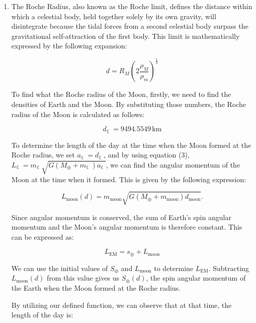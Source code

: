 \documentclass[12pt, letterpaper] {article}
\begin{document}
\begin{enumerate}
    \clearpage

    \item The Roche Radius, also known as the Roche limit, defines the distance within which a celestial body, held together solely by its own gravity, will disintegrate because the tidal forces from a second celestial body surpass the gravitational self-attraction of the first body. This limit is mathematically expressed by the following expansion:
    
    \begin{equation}
        {\displaystyle d=R_{M}\left(2{\frac {\rho _{M}}{\rho _{m}}}\right)^{\frac {1}{3}}}
    \end{equation}
  
    To find what the Roche radius of the Moon, firstly, we need to find the densities of Earth and the Moon. By substituting those numbers, the Roche radius of the Moon is calculated as follows:
    
    \begin{equation}
        d_{\leftmoon} = 9494.5549\, \text{km}
    \end{equation}
    
    To determine the length of the day at the time when the Moon formed at the Roche radius, we set $a_{\leftmoon} = d_{\leftmoon}$, and by using equation (3), $L_{\leftmoon} = m_{\leftmoon}\sqrt{G(M_{\oplus}+m_{\leftmoon})a_{\leftmoon}}$, we can find the angular momentum of the Moon at the time when it formed. This is given by the following expression:

    \begin{equation}
        L_{\text{moon}}(d) = m_{\text{moon}}\sqrt{G(M_{\oplus}+m_{\text{moon}})d_{\text{moon}}}.
    \end{equation}

    Since angular momentum is conserved, the sum of Earth's spin angular momentum and the Moon's angular momentum is therefore constant. This can be expressed as:
    
    \begin{equation}
        L_{\text{EM}} = s_{\oplus} + L_{\text{moon}}
    \end{equation}

    We can use the initial values of $S_{\oplus}$ and $L_{\text{moon}}$ to determine $L_{\text{EM}}$. Subtracting $L_{\text{moon}}(d)$ from this value gives us $S_{\oplus}(d)$, the spin angular momentum of the Earth when the Moon formed at the Roche radius.

    By utilizing our defined function, we can observe that at that time, the length of the day is:
    

\end{enumerate}
\end{document}
